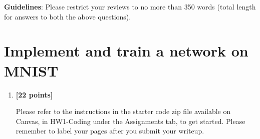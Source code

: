 \documentclass[11pt,english]{article}
\begin{document}
\textbf{Guidelines}: Please restrict your reviews to no more than 350 words (total length for answers to both the above questions).

\section{Implement and train a network on MNIST}

\begin{enumerate}[resume]

\item
\textbf{[22 points]}

Please refer to the instructions in the starter code zip file available on Canvas, in HW1-Coding under the Assignments tab, to get started. Please remember to label your pages after you submit your writeup.





\end{enumerate}
\end{document}
